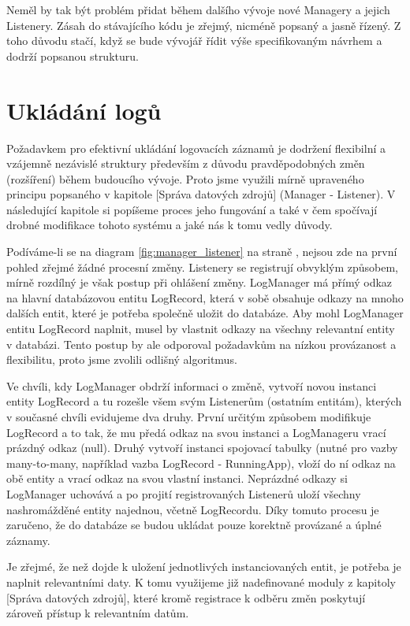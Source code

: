 \documentclass[thesis=M,czech]{FITthesis}[2012/06/26]
\begin{document}
Neměl by tak být problém přidat během dalšího vývoje nové Managery a jejich Listenery. Zásah do stávajícího kódu je zřejmý, nicméně popsaný a jasně řízený. Z toho důvodu stačí, když se bude vývojář řídit výše specifikovaným návrhem a dodrží popsanou strukturu.

\section{Ukládání logů}
Požadavkem pro efektivní ukládání logovacích záznamů je dodržení flexibilní a vzájemně nezávislé struktury především z důvodu pravděpodobných změn (rozšíření) během budoucího vývoje. Proto jsme využili mírně upraveného principu popsaného v kapitole [Správa datových zdrojů] (Manager - Listener). V následující kapitole si popíšeme proces jeho fungování a také v čem spočívají drobné modifikace tohoto systému a jaké nás k tomu vedly důvody.

Podíváme-li se na diagram \ref{fig:manager_listener} na straně \pageref{fig:manager_listener}, nejsou zde na první pohled zřejmé žádné procesní změny. Listenery se registrují obvyklým způsobem, mírně rozdílný je však postup při ohlášení změny. LogManager má přímý odkaz na hlavní databázovou entitu LogRecord, která v sobě obsahuje odkazy na mnoho dalších entit, které je potřeba společně uložit do databáze. Aby mohl LogManager entitu LogRecord naplnit, musel by vlastnit odkazy na všechny relevantní entity v databázi. Tento postup by ale odporoval požadavkům na nízkou provázanost a flexibilitu, proto jsme zvolili odlišný algoritmus.

Ve chvíli, kdy LogManager obdrží informaci o změně, vytvoří novou instanci entity LogRecord a tu rozešle všem svým Listenerům (ostatním entitám), kterých v současné chvíli evidujeme dva druhy. První určitým způsobem modifikuje LogRecord a to tak, že mu předá odkaz na svou instanci a LogManageru vrací prázdný odkaz (null). Druhý vytvoří instanci spojovací tabulky (nutné pro vazby many-to-many, například vazba LogRecord - RunningApp), vloží do ní odkaz na obě entity a vrací odkaz na svou vlastní instanci. Neprázdné odkazy si LogManager uchovává a po projití registrovaných Listenerů uloží všechny nashromážděné entity najednou, včetně LogRecordu. Díky tomuto procesu je zaručeno, že do databáze se budou ukládat pouze korektně provázané a úplné záznamy.

Je zřejmé, že než dojde k uložení jednotlivých instanciovaných entit, je potřeba je naplnit relevantními daty. K tomu využijeme již nadefinované moduly z kapitoly [Správa datových zdrojů], které kromě registrace k odběru změn poskytují zároveň přístup k relevantním datům.
\end{document}
